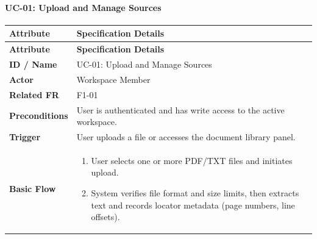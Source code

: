 
\paragraph*{UC-01: Upload and Manage Sources}

\begingroup

\small

\setlength{\tabcolsep}{5pt}

\renewcommand{\arraystretch}{1.1}

\begin{longtable}{>{\raggedright\arraybackslash}p{}>{\raggedright\arraybackslash}p{}}

\hline

\rowcolor{tablehead}

\textbf{Attribute} & \textbf{Specification Details} \\ \hline

\endfirsthead

\hline

\rowcolor{tablehead}

\textbf{Attribute} & \textbf{Specification Details} \\ \hline

\endhead

\endfoot

\endlastfoot

\textbf{ID / Name} & UC-01: Upload and Manage Sources \\ \hline

\textbf{Actor} & Workspace Member \\ \hline

\textbf{Related FR} & F1-01 \\ \hline

\textbf{Preconditions} & User is authenticated and has write access to the active workspace. \\ \hline

\textbf{Trigger} & User uploads a file or accesses the document library panel. \\ \hline

\textbf{Basic Flow} & \begin{enumerate}[nosep,leftmargin=*,label=\arabic*.]

    \item User selects one or more PDF/TXT files and initiates upload.

    \item System verifies file format and size limits, then extracts text and records locator metadata (page numbers, line offsets).


\end{enumerate}
\end{longtable}

